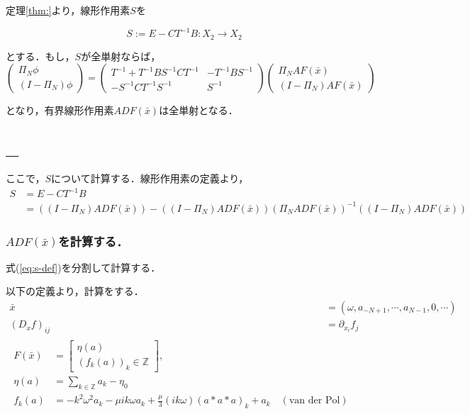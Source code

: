 \documentclass[11pt,a4paper]{jsarticle}
\theoremstyle{definition}
\begin{document}
定理\ref{thm:}より，線形作用素$S$を

\begin{equation}
  S := E-CT^{-1}B:X_2\rightarrow X_2
\end{equation}

とする．もし，$S$が全単射ならば，
\begin{equation*}
  \begin{pmatrix}
    \Pi_N \phi \\
    (I -\Pi_N) \phi
  \end{pmatrix}
  =
  \begin{pmatrix}
    T^{-1}+T^{-1}BS^{-1}CT^{-1} & -T^{-1}BS^{-1} \\
    -S^{-1}CT^{-1} S^{-1} & S^{-1}
  \end{pmatrix}
  \begin{pmatrix}
    \Pi_N A F(\bar{x}) \\
    (I - \Pi_N) A F(\bar{x})
  \end{pmatrix}
\end{equation*}

となり，有界線形作用素$ADF(\bar{x})$は全単射となる．

\subsection{_}
ここで，$S$について計算する．線形作用素の定義より，
\begin{equation}
  \begin{split}
    S &= E-CT^{-1}B \\
    &= \left( \left( I-\Pi_N \right) ADF ( \bar{x} ) \right) - (\left( I-\Pi_N \right) ADF( \bar{x} )) (\Pi_N ADF(\bar{x}))^{-1} ((I-\Pi_N)ADF(\bar{x}))
  \end{split}
  \label{eq:s-def}
\end{equation}

\subsubsection*{$ADF(\bar{x})$を計算する．}
式(\ref{eq:s-def})を分割して計算する．

以下の定義より，計算をする．
\begin{align}
  \bar{x} &= \left( \omega, a_{-N+1}, \cdots, a_{N-1}, 0, \cdots \right) \\
  (D_xf)_{ij} &= \partial_{x_i} f_j \\
  \begin{split}
    F(\bar{x}) &= \begin{bmatrix}
      \eta(a) \\
      (f_k(a))_k\in \mathbb{Z}
    \end{bmatrix}, \\
    \eta(a) &= \sum_{k\in\mathbb{Z}} a_k - \eta_0 \\
    f_k(a) &= -k^2\omega^2a_k - \mu i k \omega a_k + \frac{\mu}{3}(ik\omega)(a*a*a)_k + a_k\quad (\text{van der Pol})
  \end{split}
\end{align}
\end{document}
